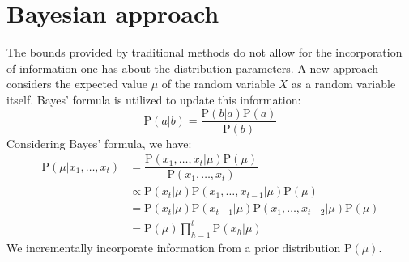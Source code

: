 \section{Bayesian approach}

The bounds provided by traditional methods do not allow for the incorporation of information one has about the distribution parameters.
A new approach considers the expected value $\mu$ of the random variable $X$ as a random variable itself.
Bayes' formula is utilized to update this information:
\[\text{P}(a|b)=\dfrac{\text{P}(b|a)\text{P}(a)}{\text{P}(b)}\]
Considering Bayes' formula, we have:
\begin{align*}
    \text{P}(\mu|x_1,\dots,x_t)     &=\dfrac{\text{P}(x_1,\dots,x_t|\mu)\text{P}(\mu)}{\text{P}(x_1,\dots,x_t)} \\
                                    &\propto \text{P}(x_t|\mu)\text{P}(x_1,\dots,x_{t-1}|\mu)\text{P}(\mu) \\
                                    &= \text{P}(x_t|\mu)\text{P}(x_{t-1}|\mu)\text{P}(x_1,\dots,x_{t-2}|\mu)\text{P}(\mu) \\
                                    &=\text{P}(\mu)\prod_{h=1}^{t}\text{P}(x_h|\mu)
\end{align*}
We incrementally incorporate information from a prior distribution $\text{P}(\mu)$.